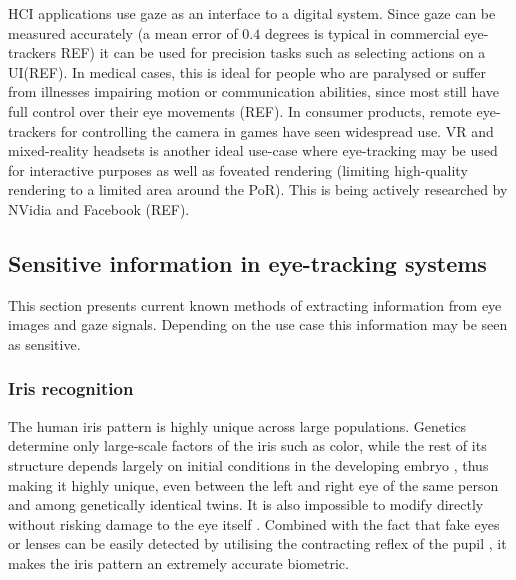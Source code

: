 HCI applications use gaze as an interface to a digital system. Since gaze can be measured accurately (a mean error of $0.4$ degrees is typical in commercial eye-trackers REF) it can be used for precision tasks such as selecting actions on a UI(REF). In medical cases, this is ideal for people who are paralysed or suffer from illnesses impairing motion or communication abilities, since most still have full control over their eye movements (REF). In consumer products, remote eye-trackers for controlling the camera in games have seen widespread use. VR and mixed-reality headsets is another ideal use-case where eye-tracking may be used for interactive purposes as well as foveated rendering (limiting high-quality rendering to a limited area around the PoR). This is being actively researched by NVidia and Facebook (REF).

\subsection{Sensitive information in eye-tracking systems}
This section presents current known methods of extracting information from eye images and gaze signals. Depending on the use case this information may be seen as sensitive.

\subsubsection{Iris recognition}
The human iris pattern is highly unique across large populations. Genetics determine only large-scale factors of the iris such as color, while the rest of its structure depends largely on initial conditions in the developing embryo \cite{kronfeldCHAPTERGrossAnatomy1962}, thus making it highly unique, even between the left and right eye of the same person and among genetically identical twins. It is also impossible to modify directly without risking damage to the eye itself \parencite{DAUGMAN_IRIS_ORIG}. Combined with the fact that fake eyes or lenses can be easily detected by utilising the contracting reflex of the pupil \parencite{DAUGMAN_IRIS_ORIG}, it makes the iris pattern an extremely accurate biometric. 

